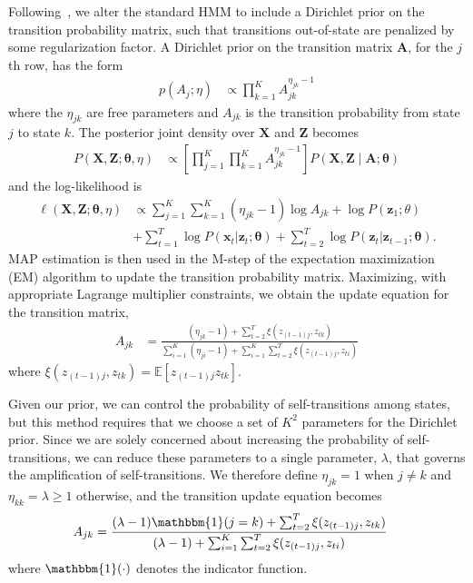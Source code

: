 \documentclass[letterpaper]{article}
\begin{document}
Following~\cite{MAP1994}, we alter the standard HMM to include a Dirichlet prior on the transition probability matrix, such that transitions out-of-state are penalized by some regularization factor. A Dirichlet prior on the transition matrix $\mathbf{A}$, for the $j$th row, has the form
\begin{align*}
    p(A_j; \eta) &\propto \prod_{k=1}^{K} A_{jk}^{\eta_{jk}-1}
\end{align*}
where the $\eta_{jk}$ are free parameters and $A_{jk}$ is the transition probability from state $j$ to state $k$. The posterior joint density over $\mathbf{X}$ and $\mathbf{Z}$ becomes
\begin{align*}
    P(\mathbf{X}, \mathbf{Z} ; \mathbf{\theta}, \eta) 
    &\propto \left[\prod_{j=1}^{K}\prod_{k=1}^{K} A_{jk}^{\eta_{jk} - 1}\right] P(\mathbf{X}, \mathbf{Z} \mid \mathbf{A}; \mathbf{\theta}) 
\end{align*}
and the log-likelihood is
\begin{align*}
\ell(\mathbf{X}, \mathbf{Z} ; \mathbf{\theta}, \eta) 
&\propto \sum_{j=1}^{K}\sum_{k=1}^{K} (\eta_{jk} - 1)\log A_{jk} + \log P(\mathbf{z}_{1}; \theta) \\
&+ \sum_{t=1}^{T}\log P(\mathbf{x}_t|\mathbf{z}_t; \mathbf{\theta}) + \sum_{t=2}^{T}\log P(\mathbf{z}_t|\mathbf{z}_{t-1}; \mathbf{\theta}).
\end{align*}
MAP estimation is then used in the M-step of the expectation maximization (EM) algorithm to update the transition probability matrix. Maximizing, with appropriate Lagrange multiplier constraints, we obtain the update equation for the transition matrix, 
\begin{align}
    A_{jk} &= \frac{(\eta_{jk} - 1) + \sum_{t=2}^{T} \xi(z_{(t-1)j}, z_{tk})}   
    {\sum_{i=1}^{K}(\eta_{ji} - 1) + \sum_{i=1}^{K}\sum_{t=2}^{T} \xi(z_{(t-1)j}, z_{ti})}
\end{align}
where $\xi(z_{(t-1)j}, z_{tk})=\mathbb{E}[z_{(t-1)j}z_{tk}]$.

Given our prior, we can control the probability of self-transitions among states, but this method requires that we choose a set of $K^2$ parameters for the Dirichlet prior. Since we are solely concerned about increasing the probability of self-transitions, we can reduce these parameters to a single parameter, $\lambda$, that governs the amplification of self-transitions. We therefore define $\eta_{jk} = 1$ when $j\not=k$ and $\eta_{kk}= \lambda \geq 1$ otherwise, and the transition update equation becomes
\begin{align}\label{eq:MAP-final}
    A_{jk} &= \frac{(\lambda - 1){\mathbbm{1}(j = k)} + \sum_{t=2}^{T} \xi(z_{(t-1)j}, z_{tk})}   
    {(\lambda - 1) + \sum_{i=1}^{K}\sum_{t=2}^{T} \xi(z_{(t-1)j}, z_{ti})}
\end{align}
where $\mathbbm{1}(\cdot)$ denotes the indicator function.
\end{document}
